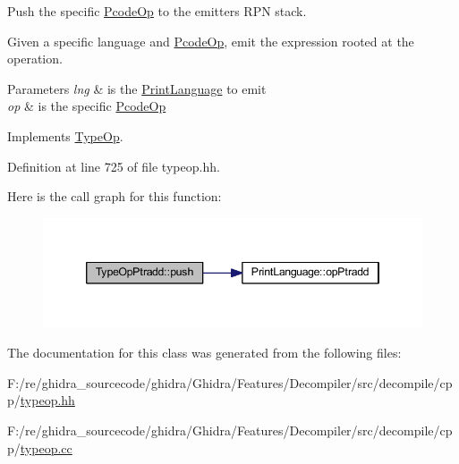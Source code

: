 Push the specific \mbox{\hyperlink{class_pcode_op}{Pcode\+Op}} to the emitter\textquotesingle{}s R\+PN stack. 

Given a specific language and \mbox{\hyperlink{class_pcode_op}{Pcode\+Op}}, emit the expression rooted at the operation. 
\begin{DoxyParams}{Parameters}
{\em lng} & is the \mbox{\hyperlink{class_print_language}{Print\+Language}} to emit \\
\hline
{\em op} & is the specific \mbox{\hyperlink{class_pcode_op}{Pcode\+Op}} \\
\hline
\end{DoxyParams}


Implements \mbox{\hyperlink{class_type_op_ac9c9544203ed74dabe6ac662b653b2af}{Type\+Op}}.



Definition at line 725 of file typeop.\+hh.

Here is the call graph for this function\+:
\nopagebreak
\begin{figure}[H]
\begin{center}
\leavevmode
\includegraphics[width=346pt]{class_type_op_ptradd_a970a05b6c01a70ecad769c461cbf40af_cgraph}
\end{center}
\end{figure}


The documentation for this class was generated from the following files\+:\begin{DoxyCompactItemize}
\item 
F\+:/re/ghidra\+\_\+sourcecode/ghidra/\+Ghidra/\+Features/\+Decompiler/src/decompile/cpp/\mbox{\hyperlink{typeop_8hh}{typeop.\+hh}}\item 
F\+:/re/ghidra\+\_\+sourcecode/ghidra/\+Ghidra/\+Features/\+Decompiler/src/decompile/cpp/\mbox{\hyperlink{typeop_8cc}{typeop.\+cc}}\end{DoxyCompactItemize}

